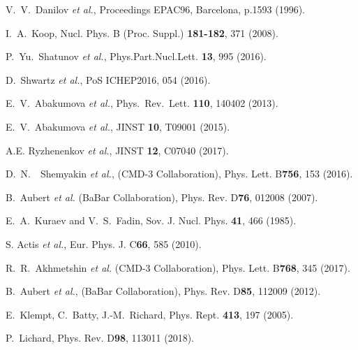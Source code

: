 \begin{thebibliography}{99}
  V.\ V.\ Danilov {\em et al.}, Proceedings EPAC96, Barcelona, p.1593 (1996).

I.\ A.\ Koop, Nucl. Phys. B (Proc. Suppl.) {\bf 181-182}, 371 (2008).

P.\ Yu.\ Shatunov {\em et al.}, Phys.Part.Nucl.Lett. {\bf 13}, 995 (2016).

D.\ Shwartz {\em et al.}, PoS ICHEP2016, 054 (2016).

E.\ V.\ Abakumova  {\it et al.}, Phys.\ Rev.\ Lett. {\bf 110}, 140402 (2013).

E.\ V.\ Abakumova  {\it et al.}, JINST {\bf 10}, T09001 (2015).

 A.E. Ryzhenenkov {\it et al.}, 
JINST {\bf 12}, C07040 (2017).


 D.\ N.\ ~Shemyakin {\it et al.}, (CMD-3 Collaboration), 
Phys. Lett. B{\bf 756}, 153 (2016).

 B.\ Aubert {\em et al.} (BaBar Collaboration),
Phys. Rev. D{\bf 76}, 012008 (2007).

E.\ A.\ Kuraev and V.\ S.\ Fadin, Sov. J. Nucl. Phys. {\bf 41}, 466 (1985). 

S. Actis {\em et al.}, Eur. Phys. J. C{\bf 66}, 585 (2010). 

 R.\ R.\ Akhmetshin {\it et al.} (CMD-3 Collaboration), 
Phys. Lett. B{\bf 768}, 345 (2017).

 B.\ Aubert {\it et al.}, (BaBar Collaboration), 
Phys. Rev. D{\bf 85}, 112009 (2012).

 E.\ Klempt, C.\ Batty, J.-M.\ Richard,
 	Phys. Rept. {\bf 413}, 197 (2005).

 P.\ Lichard, Phys. Rev. D{\bf 98}, 113011 (2018). 

\end{thebibliography}
